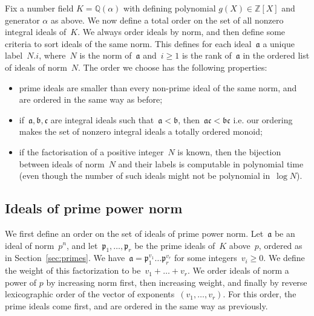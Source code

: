 \documentclass{article}
\def\Z{{\mathbb Z}}
\def\Q{{\mathbb Q}}
\def\a{{\mathfrak a}}
\def\b{{\mathfrak b}}
\def\idc{{\mathfrak c}}
\def\p{{\mathfrak p}}
\begin{document}
Fix a number field $K=\Q(\alpha)$ with defining polynomial
$g(X)\in\Z[X]$ and generator $\alpha$ as above. 
We now define a total order on the set of all nonzero integral ideals of~$K$.
We always order ideals by norm, and then define some criteria to sort ideals of
the same norm. This defines for each ideal~$\a$ a unique label~$N.i$, where~$N$
is the norm of~$\a$ and~$i\ge 1$ is the rank of~$\a$ in the ordered list of
ideals of norm~$N$.
The order we choose has the following properties:
\begin{itemize}
  \item prime ideals are smaller than every non-prime ideal of the same norm,
    and are ordered in the same way as before;
  \item if~$\a,\b,\idc$ are integral ideals such that~$\a<\b$, then~$\a\idc<\b\idc$
    i.e. our ordering makes the set of nonzero integral ideals a totally ordered
    monoid;
  \item if the factorisation of a positive integer~$N$ is known, then the
    bijection between ideals of norm~$N$ and their labels is computable in
    polynomial time (even though the number of such ideals might not be
    polynomial in~$\log N$).
\end{itemize}

\subsection{Ideals of prime power norm}\label{sec:primepowernorm}

We first define an order on the set of ideals of prime power norm. Let~$\a$ be
an ideal of norm~$p^n$, and let~$\p_1,\dots,\p_r$ be the prime ideals of~$K$
above~$p$, ordered as in Section~\ref{sec:primes}. We have~$\a = \p_1^{v_1}\dots
\p_r^{v_r}$ for some integers~$v_i\ge 0$. We define the weight of this
factorization to be~$v_1+\dots+v_r$. We order ideals of norm a power of $p$ by
increasing norm first, then increasing weight, and finally by reverse
lexicographic order of the vector of exponents~$(v_1,\dots,v_r)$. For this
order, the prime ideals come first, and are ordered in the same way as
previously.
\end{document}

